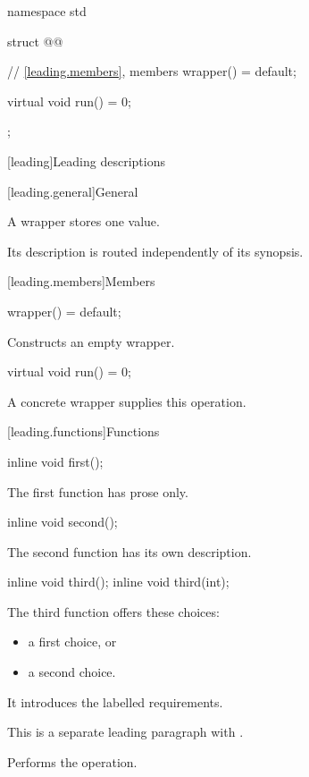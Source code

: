 \begin{codeblock}
namespace std {
  struct @@ {
    // \ref{leading.members}, members
    wrapper() = default;

    virtual void run() = 0;
  };
}
\end{codeblock}

[leading]{Leading descriptions}

[leading.general]{General}

\pnum
A wrapper stores one value.

\pnum
Its description is routed independently of its synopsis.

[leading.members]{Members}

%
\begin{itemdecl}
wrapper() = default;
\end{itemdecl}

\begin{itemdescr}
\pnum
Constructs an empty wrapper.
\end{itemdescr}

%
\begin{itemdecl}
virtual void run() = 0;
\end{itemdecl}

\begin{itemdescr}
\pnum
A concrete wrapper supplies this operation.
\end{itemdescr}

[leading.functions]{Functions}

%
\begin{itemdecl}
inline void first();
\end{itemdecl}

\begin{itemdescr}
\pnum
The first function has prose only.
\end{itemdescr}

%
\begin{itemdecl}
inline void second();
\end{itemdecl}

\begin{itemdescr}
\pnum
The second function has its own description.
\end{itemdescr}

%
\begin{itemdecl}
inline void third();
inline void third(int);
\end{itemdecl}

\begin{itemdescr}
\pnum
The third function offers these choices:
\begin{itemize}
\item a first choice, or
\item a second choice.
\end{itemize}
It introduces the labelled requirements.

\pnum
This is a separate leading paragraph with .

\pnum
\effects
Performs the operation.
\end{itemdescr}
